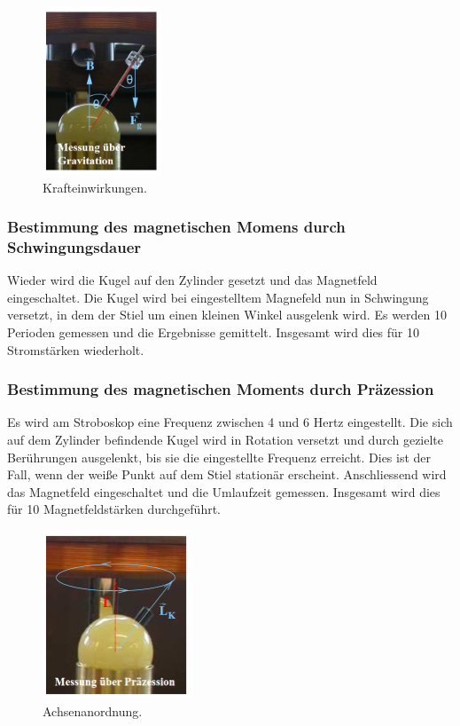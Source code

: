 \begin{figure}[H]
  \centering
  \includegraphics[height=5cm]{Screenshot (4)}
  \caption{Krafteinwirkungen.}
  \label{fig:drill}
\end{figure}


\subsubsection{Bestimmung des magnetischen Momens durch Schwingungsdauer}

Wieder wird die Kugel auf den Zylinder gesetzt und das Magnetfeld eingeschaltet.
Die Kugel wird bei eingestelltem Magnefeld nun in Schwingung versetzt, in dem der Stiel um einen kleinen Winkel ausgelenk wird.
Es werden 10 Perioden gemessen und die Ergebnisse gemittelt. Insgesamt wird dies für 10 Stromstärken wiederholt.


\subsubsection{Bestimmung des magnetischen Moments durch Präzession}

Es wird am Stroboskop eine Frequenz zwischen 4 und 6 Hertz eingestellt.
Die sich auf dem Zylinder befindende Kugel wird in Rotation versetzt und durch gezielte Berührungen ausgelenkt, bis sie die eingestellte Frequenz erreicht.
Dies ist der Fall, wenn der weiße Punkt auf dem Stiel stationär erscheint.
Anschliessend wird das Magnetfeld eingeschaltet und die Umlaufzeit gemessen.
Insgesamt wird dies für 10 Magnetfeldstärken durchgeführt.


\begin{figure}[H]
  \centering
  \includegraphics[height=5cm]{Screenshot (5).png}
  \caption{Achsenanordnung.}
  \label{fig:drill}
\end{figure}